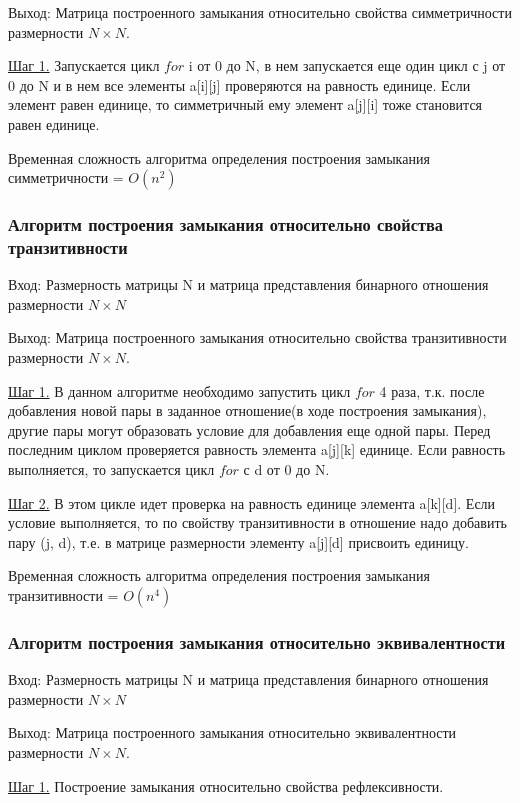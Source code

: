 \documentclass[bachelor, och, labwork]{shiza}
\begin{document}
	$\textit{Выход:}$  Матрица построенного замыкания относительно свойства симметричности размерности $N \times N$.
	
	\underline{Шаг 1.} Запускается цикл $for$ i от 0 до N, в нем запускается еще один цикл с j от 0 до N и в нем все элементы a[i][j] проверяются на равность единице. Если элемент равен единице, то симметричный ему элемент a[j][i] тоже становится равен единице.
	
	Временная сложность алгоритма определения построения замыкания симметричности = $O(n^2)$
	
	\subsubsection{Алгоритм построения замыкания относительно свойства транзитивности}

	$\textit{Вход:}$ Размерность матрицы N и матрица представления бинарного отношения размерности $N \times N$
	
	$\textit{Выход:}$  Матрица построенного замыкания относительно свойства транзитивности размерности $N \times N$.
	
	\underline{Шаг 1.} В данном алгоритме необходимо запустить цикл $for$ 4 раза, т.к. после добавления новой пары в заданное отношение(в ходе построения замыкания), другие пары могут образовать условие для добавления еще одной пары. Перед последним циклом проверяется равность элемента a[j][k] единице. Если равность выполняется, то запускается цикл $for$ с d от 0 до N.
	
	\underline{Шаг 2.} В этом цикле идет проверка на равность единице элемента a[k][d]. Если условие выполняется, то по свойству транзитивности в отношение надо добавить пару (j, d), т.е. в матрице размерности элементу a[j][d] присвоить единицу.
	
	Временная сложность алгоритма определения построения замыкания транзитивности = $O(n^4)$
	
	\subsubsection{Алгоритм построения замыкания относительно эквивалентности}

	$\textit{Вход:}$ Размерность матрицы N и матрица представления бинарного отношения размерности $N \times N$
	
	$\textit{Выход:}$  Матрица построенного замыкания относительно эквивалентности размерности $N \times N$.
	
	\underline{Шаг 1.} Построение замыкания относительно свойства рефлексивности.
	
\end{document}
